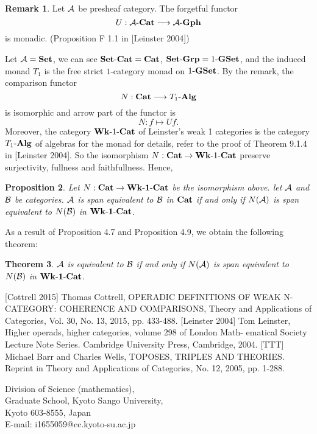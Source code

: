 \documentclass[12pt]{article}
\theoremstyle{plain}
\newtheorem{theorem}{Theorem}[section]
\newtheorem{proposition}[theorem]{Proposition}
\theoremstyle{definition}
\newtheorem{remark}[theorem]{Remark}
\begin{document}
\begin{remark}
Let ${\cal A}$ be presheaf category. The forgetful functor
\[
U: {\cal A} \mathchar`- {\bf Cat} \longrightarrow {\cal A} \mathchar`- {\bf Gph}
\]
is monadic. (Proposition F 1.1 in [Leinster 2004])
\end{remark}
\noindent
Let ${\cal A} = {\bf Set}$, we can see ${\bf Set} \mathchar`- {\bf Cat} = {\bf Cat}$, ${\bf Set} \mathchar`- {\bf Grp} = 1 \mathchar`- {\bf GSet}$, and the induced monad $T_1$ is the free strict $1$-category monad on $1 \mathchar`- {\bf GSet}$. By the remark, the comparison functor 
\[
N: {\bf Cat} \longrightarrow T_1 \mathchar`- {\bf Alg}
\]
is isomorphic and arrow part of the functor is
\[
N: f \longmapsto Uf .
\]
Moreover, the category ${\bf Wk} \mathchar`- 1 \mathchar`- {\bf Cat}$ of Leinster's weak 1 categories is the category $T_1 \mathchar`- {\bf Alg}$ of algebras for the monad for details,  refer to the proof of Theorem 9.1.4 in [Leinster 2004].
So the isomorphism $N: {\bf Cat} \rightarrow {\bf Wk} \mathchar`- 1 \mathchar`- {\bf Cat}$ preserve surjectivity, fullness and faithfullness. Hence,

\begin{proposition}
Let $N: {\bf Cat} \rightarrow {\bf Wk \mathchar`- 1 \mathchar`- Cat}$ be the isomorphism above. let ${\cal A}$ and ${\cal B}$ be categories. ${\cal A}$ is span equivalent to ${\cal B}$ in ${\bf Cat}$ if and only if $N({\cal A})$ is span equivalent to $N({\cal B})$ in ${\bf Wk \mathchar`- 1 \mathchar`- Cat}$.
\end{proposition}

\noindent
As a result of Proposition 4.7 and Proposition 4.9, we obtain the following theorem:

\begin{theorem}
${\cal A}$ is equivalent to ${\cal B}$ if and only if $N({\cal A})$ is span equivalent to $N({\cal B})$ in ${\bf Wk \mathchar`- 1 \mathchar`- Cat}$.
\end{theorem}



\begin{thebibliography}{99}
 [Cottrell 2015] Thomas Cottrell, OPERADIC DEFINITIONS OF WEAK N-CATEGORY: COHERENCE AND COMPARISONS, Theory and Applications of Categories, Vol. 30, No. 13, 2015, pp. 433-488.
 [Leinster 2004] Tom Leinster, Higher operads, higher categories, volume 298 of London Math-
ematical Society Lecture Note Series. Cambridge University Press, Cambridge, 2004.
 [TTT] Michael Barr and Charles Wells, TOPOSES, TRIPLES AND THEORIES. Reprint in Theory and Applications of Categories, No. 12, 2005, pp. 1-288.
\end{thebibliography}


\vspace{5mm}
\noindent
Division of Science (mathematics), \\
Graduate School, Kyoto Sango University, \\
Kyoto 603-8555, Japan \\
E-mail: i1655059@cc.kyoto-su.ac.jp


\end{document}
